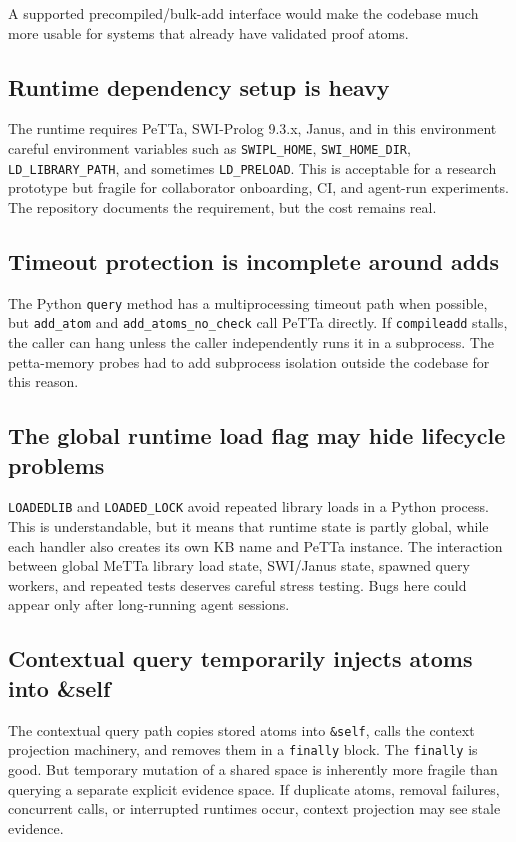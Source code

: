 \documentclass[11pt]{article}
\newcommand{\code}[1]{\texttt{#1}}
\begin{document}
A supported precompiled/bulk-add interface would make the codebase much more
usable for systems that already have validated proof atoms.

\subsection{Runtime dependency setup is heavy}

The runtime requires PeTTa, SWI-Prolog 9.3.x, Janus, and in this environment
careful environment variables such as \code{SWIPL\_HOME}, \code{SWI\_HOME\_DIR},
\code{LD\_LIBRARY\_PATH}, and sometimes \code{LD\_PRELOAD}.  This is acceptable
for a research prototype but fragile for collaborator onboarding, CI, and
agent-run experiments.  The repository documents the requirement, but the cost
remains real.

\subsection{Timeout protection is incomplete around adds}

The Python \code{query} method has a multiprocessing timeout path when possible,
but \code{add\_atom} and \code{add\_atoms\_no\_check} call PeTTa directly.  If
\code{compileadd} stalls, the caller can hang unless the caller independently
runs it in a subprocess.  The petta-memory probes had to add subprocess isolation
outside the codebase for this reason.

\subsection{The global runtime load flag may hide lifecycle problems}

\code{LOADEDLIB} and \code{LOADED\_LOCK} avoid repeated library loads in a Python
process.  This is understandable, but it means that runtime state is partly
global, while each handler also creates its own KB name and PeTTa instance.  The
interaction between global MeTTa library load state, SWI/Janus state, spawned
query workers, and repeated tests deserves careful stress testing.  Bugs here
could appear only after long-running agent sessions.

\subsection{Contextual query temporarily injects atoms into \&self}

The contextual query path copies stored atoms into \code{\&self}, calls the
context projection machinery, and removes them in a \code{finally} block.  The
\code{finally} is good.  But temporary mutation of a shared space is inherently
more fragile than querying a separate explicit evidence space.  If duplicate
atoms, removal failures, concurrent calls, or interrupted runtimes occur, context
projection may see stale evidence.
\end{document}
